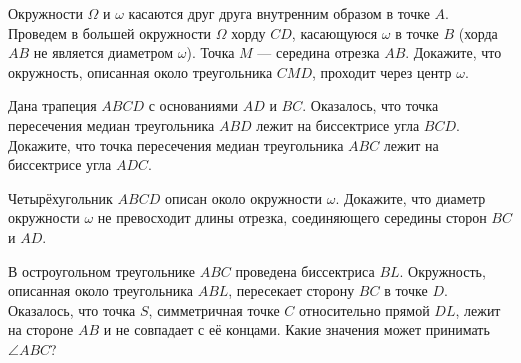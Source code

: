 \documentclass{article}
\begin{document}
\begin{enumerate_boxed}
        \item Окружности $\Omega$ и $\omega$ касаются друг друга внутренним образом в точке $A$.
        Проведем в большей окружности $\Omega$ хорду $CD$, касающуюся $\omega$ в точке $B$ (хорда $AB$ не является диаметром $\omega$). Точка $M$ — середина отрезка $AB$.
        Докажите, что окружность, описанная около треугольника $CMD$, проходит через центр $\omega$.

        \item Дана трапеция $ABCD$ с основаниями $AD$ и $BC$.
        Оказалось, что точка пересечения медиан треугольника $ABD$ лежит на биссектрисе угла $BCD$.
        Докажите, что точка пересечения медиан треугольника $ABC$ лежит на биссектрисе угла $ADC$.

        \item Четырёхугольник $ABCD$ описан около окружности $\omega$.
        Докажите, что диаметр окружности $\omega$ не превосходит длины отрезка, соединяющего середины сторон $BC$ и $AD$.

        \item В остроугольном треугольнике $ABC$ проведена биссектриса $BL$.
        Окружность, описанная около треугольника $ABL$, пересекает сторону $BC$ в точке $D$.
        Оказалось, что точка $S$, симметричная точке $C$ относительно прямой $DL$, лежит на стороне $AB$ и не совпадает с её концами.
        Какие значения может принимать $\angle ABC$?

    \end{enumerate_boxed}
\end{document}
